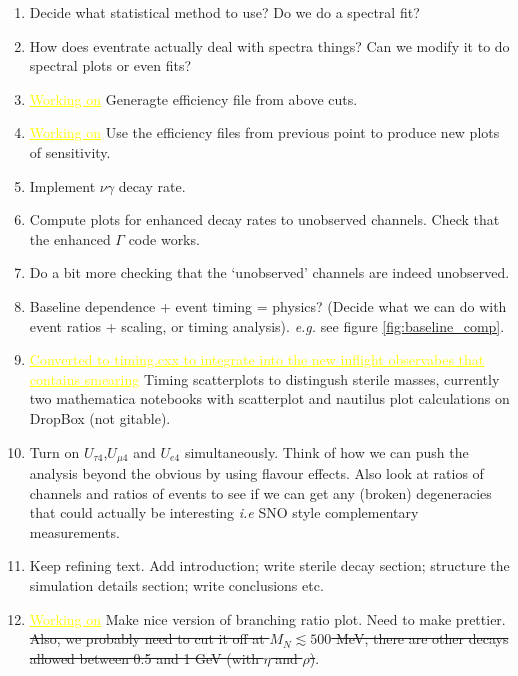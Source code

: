 \documentclass[11pt, a4paper]{article}
\newcommand{\newtext}[2]{\textcolor{#1}{\ul{#2}}}
\begin{document}
\begin{enumerate}


\item Decide what statistical method to use? Do we do a spectral fit?

\item How does eventrate actually deal with spectra things? Can we modify it to 
do spectral plots or even fits?


\item \newtext{MARK}{Working on} Generagte efficiency file from above cuts.

\item \newtext{MARK}{Working on} Use the efficiency files from previous point to produce new plots of
sensitivity.

\item Implement $\nu\gamma$ decay rate. 

\item Compute plots for enhanced decay rates to unobserved channels. Check that
the enhanced $\Gamma$ code works.

\item Do a bit more checking that the `unobserved' channels are indeed unobserved.

\item Baseline dependence + event timing = physics? (Decide what we can do with
event ratios + scaling, or timing analysis).  \emph{e.g.} see figure
\ref{fig:baseline_comp}.

\item \newtext{MARK}{Converted to timing.cxx to integrate into the new inflight observabes that contains smearing} Timing scatterplots to distingush sterile masses, currently two mathematica notebooks with scatterplot and nautilus plot calculations on DropBox (not gitable).

\item Turn on $U_{\tau 4}$,$U_{\mu 4}$ and $U_{e4}$ simultaneously. Think of
how we can push the analysis beyond the obvious by using flavour effects. Also
look at ratios of channels and ratios of events to see if we can get any
(broken) degeneracies that could actually be interesting \emph{i.e} SNO style
complementary measurements.

\item Keep refining text. Add introduction; write sterile decay section; structure 
the simulation details section; write conclusions etc.

\item \newtext{MARK}{Working on} Make nice version of branching ratio plot. Need to make prettier. \sout{Also, we probably need to cut it off at 
	$M_N\lesssim 500$ MeV, there are other decays allowed between 0.5 and 1 GeV (with $\eta$ and $\rho$)}.


\end{enumerate}
\end{document}

